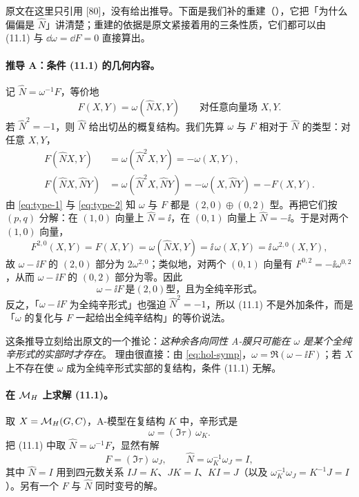 原文在这里只引用 [80]，没有给出推导。下面是我们补的重建（\pB），它把「为什么偏偏是 \(\hat N\)」讲清楚；重建的依据是原文紧接着用的三条性质，它们都可以由 (11.1) 与 \(\dd\omega=\dd F=0\) 直接算出。

\paragraph{推导 A：条件 (11.1) 的几何内容。}记 \(\hat N=\omega^{-1}F\)，等价地
\begin{equation}
F(X,Y)=\omega(\hat N X,Y)\qquad \text{对任意向量场 }X,Y.
\label{eq:F-N}
\end{equation}
若 \(\hat N^2=-1\)，则 \(\hat N\) 给出切丛的概复结构。我们先算 \(\omega\) 与 \(F\) 相对于 \(\hat N\) 的类型：对任意 \(X,Y\)，
\begin{align}
F(\hat N X,Y) &= \omega(\hat N^2 X,Y)=-\omega(X,Y), \label{eq:type-1}\\
F(\hat N X,\hat N Y) &= \omega(\hat N^2X,\hat N Y)=-\omega(X,\hat N Y)=-F(X,Y). \label{eq:type-2}
\end{align}
由 \eqref{eq:type-1} 与 \eqref{eq:type-2} 知 \(\omega\) 与 \(F\) 都是 \((2,0)\oplus(0,2)\) 型。再把它们按 \((p,q)\) 分解：在 \((1,0)\) 向量上 \(\hat N=\ii\)，在 \((0,1)\) 向量上 \(\hat N=-\ii\)。于是对两个 \((1,0)\) 向量，
\begin{equation}
F^{2,0}(X,Y)=F(X,Y)=\omega(\hat N X,Y)=\ii\,\omega(X,Y)=\ii\,\omega^{2,0}(X,Y),
\label{eq:type-3}
\end{equation}
故 \(\omega-\ii F\) 的 \((2,0)\) 部分为 \(2\omega^{2,0}\)；类似地，对两个 \((0,1)\) 向量有 \(F^{0,2}=-\ii\omega^{0,2}\)，从而 \(\omega-\ii F\) 的 \((0,2)\) 部分为零。因此
\begin{equation}
\omega-\ii F\ \text{是} (2,0)\text{型，且为全纯辛形式。}
\label{eq:hol-symp}
\end{equation}
反之，「\(\omega-\ii F\) 为全纯辛形式」也强迫 \(\hat N^2=-1\)，所以 (11.1) 不是外加条件，而是「\(\omega\) 的复化与 \(F\) 一起给出全纯辛结构」的等价说法。\pB{}

这条推导立刻给出原文的一个推论：\emph{这种余各向同性 A-膜只可能在 \(\omega\) 是某个全纯辛形式的实部时才存在}。\pA{} 理由很直接：由 \eqref{eq:hol-symp}，\(\omega=\Re(\omega-\ii F)\)；若 \(X\) 上不存在使 \(\omega\) 成为全纯辛形式实部的复结构，条件 (11.1) 无解。

\paragraph{在 \(\mathcal{M}_H\) 上求解 (11.1)。}取 \(X=\mathcal{M}_H(G,C)\)，A-模型在复结构 \(K\) 中，辛形式是
\begin{equation}
\omega=(\Im\tau)\,\omega_K .
\label{eq:omega-K}
\end{equation}
把 (11.1) 中取 \(\hat N=\omega^{-1}F\)，显然有解
\begin{equation}
F=(\Im\tau)\,\omega_J,\qquad \hat N=\omega_K^{-1}\omega_J=I,
\label{eq:F-sol}
\end{equation}
其中 \(\hat N=I\) 用到四元数关系 \(IJ=K\)、\(JK=I\)、\(KI=J\)（以及 \(\omega_K^{-1}\omega_J=K^{-1}J=I\)）。另有一个 \(F\) 与 \(\hat N\) 同时变号的解。\pA{}

